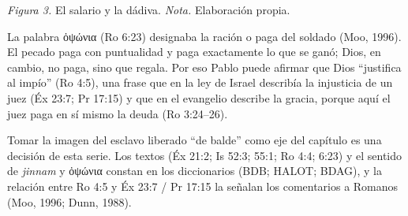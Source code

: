 \documentclass[11pt,letterpaper]{article}
\newcommand{\grc}[1]{\foreignlanguage{ancientgreek}{#1}}
\begin{document}
\begin{center}
\par
{\footnotesize\color{gris}\textit{Figura 3.} El salario y la dádiva. \textit{Nota.} Elaboración propia.}
\end{center}

La palabra \grc{ὀψώνια} (Ro 6:23) designaba la ración o paga del soldado (Moo, 1996). El pecado paga con puntualidad y paga exactamente lo que se ganó; Dios, en cambio, no paga, sino que regala. Por eso Pablo puede afirmar que Dios ``justifica al impío'' (Ro 4:5), una frase que en la ley de Israel describía la injusticia de un juez (Éx 23:7; Pr 17:15) y que en el evangelio describe la gracia, porque aquí el juez paga en sí mismo la deuda (Ro 3:24--26).

\begin{nota}[Precisión]
Tomar la imagen del esclavo liberado ``de balde'' como eje del capítulo es una decisión de esta serie. Los textos (Éx 21:2; Is 52:3; 55:1; Ro 4:4; 6:23) y el sentido de \emph{jinnam} y \grc{ὀψώνια} constan en los diccionarios (BDB; HALOT; BDAG), y la relación entre Ro 4:5 y Éx 23:7 / Pr 17:15 la señalan los comentarios a Romanos (Moo, 1996; Dunn, 1988).
\end{nota}
\end{document}
